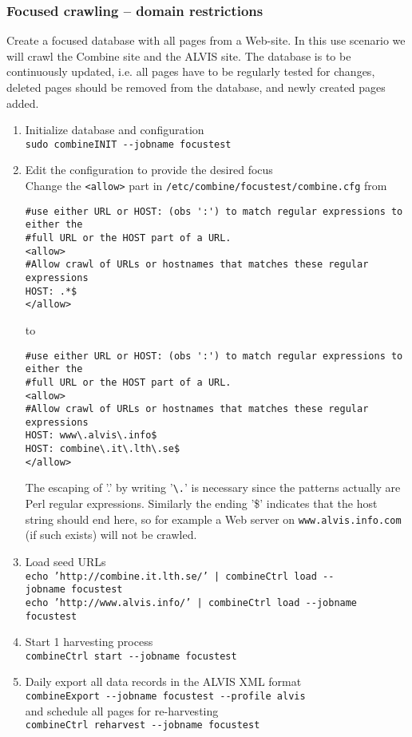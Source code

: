 \subsubsection{Focused crawling -- domain restrictions}
\label{domainfocus}
Create a focused database with all pages from a Web-site. In this
use scenario we will crawl the Combine site and the ALVIS site.
The database is to be continuously updated, i.e. all pages have to be
regularly tested for changes, deleted pages should be removed from
the database, and newly created pages added.
\begin{enumerate}
\item    Initialize database and configuration\\
{\tt  sudo combineINIT \verb+--+jobname focustest}

\item Edit the configuration to provide the desired focus\\
Change the {\tt <allow>} part in {\tt /etc/combine/focustest/combine.cfg} from
\begin{verbatim}
#use either URL or HOST: (obs ':') to match regular expressions to either the
#full URL or the HOST part of a URL.
<allow>
#Allow crawl of URLs or hostnames that matches these regular expressions
HOST: .*$
</allow>
\end{verbatim}
to\\
\begin{verbatim}
#use either URL or HOST: (obs ':') to match regular expressions to either the
#full URL or the HOST part of a URL.
<allow>
#Allow crawl of URLs or hostnames that matches these regular expressions
HOST: www\.alvis\.info$
HOST: combine\.it\.lth\.se$
</allow>
\end{verbatim}
The escaping of '.' by writing '\verb+\.+' is necessary since the patterns
actually are Perl regular expressions. Similarly the ending '\$'
indicates that the host string should end here, so for example
a Web server on {\tt www.alvis.info.com} (if such exists) will
not be crawled.

\item Load seed URLs\\
{\tt  echo 'http://combine.it.lth.se/' | combineCtrl  load \verb+--+jobname~focustest}\\
{\tt  echo 'http://www.alvis.info/' | combineCtrl  load \verb+--+jobname focustest}

\item  Start 1 harvesting process\\
{\tt  combineCtrl  start \verb+--+jobname focustest}

\item  Daily export all data records in the ALVIS XML format\\
{\tt  combineExport \verb+--+jobname focustest \verb+--+profile alvis}\\
and schedule all pages for re-harvesting\\
{\tt combineCtrl reharvest \verb+--+jobname focustest}
\end{enumerate}


